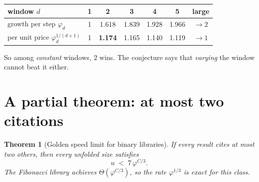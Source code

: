 \documentclass[11pt]{article}
\newtheorem{theorem}{Theorem}
\theoremstyle{remark}
\begin{document}
\begin{center}\small
\begin{tabular}{lcccccc}
\toprule
window $d$ & 1 & 2 & 3 & 4 & 5 & large \\
\midrule
growth per step $\varphi_d$ & 1 & 1.618 & 1.839 & 1.928 & 1.966 & $\to 2$ \\
per unit price $\varphi_d^{1/(d+1)}$ & 1 & \textbf{1.174} & 1.165 & 1.140 & 1.119 & $\to 1$ \\
\bottomrule
\end{tabular}
\end{center}

\noindent So among \emph{constant} windows, $2$ wins. The conjecture says that
\emph{varying} the window cannot beat it either.

\section{A partial theorem: at most two citations}

\begin{theorem}[Golden speed limit for binary libraries]\label{thm:A}
If every result cites at most two others, then every unfolded size satisfies
\[
u \;<\; 7\,\varphi^{C/3}.
\]
The Fibonacci library achieves $\Theta(\varphi^{C/3})$, so the rate $\varphi^{1/3}$ is
exact for this class.
\end{theorem}
\end{document}
